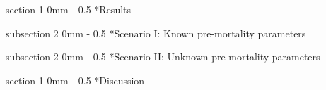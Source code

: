 \documentclass[12pt, a4paper]{article}
\makeatletter
\renewcommand{\section}{\@startsection
{section}%
{1}%
{0mm}%
{-\baselineskip}%
{0.5\baselineskip}%
{\normalfont\bf\large}} %
\renewcommand{\subsection}{\@startsection
{subsection}%
{2}%
{0mm}%
{-\baselineskip}%
{0.5\baselineskip}%
{\normalfont\bf}} %
\makeatother
\begin{document}

\section*{Results}

\subsection*{Scenario I: Known pre-mortality parameters}

\subsection*{Scenario II: Unknown pre-mortality parameters}

\section*{Discussion}


\singlespacing


\end{document}
